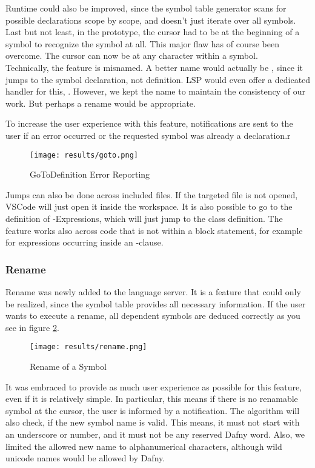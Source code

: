 Runtime could also be improved, since the symbol table generator scans for possible declarations scope by scope, and doesn't just iterate over all symbols.
Last but not least, in the prototype, the cursor had to be at the beginning of a symbol to recognize the symbol at all.
This major flaw has of course been overcome.
The cursor can now be at any character within a symbol.\\

Technically, the feature is misnamed.
A better name would actually be , since it jumps to the symbol declaration, not definition.
LSP would even offer a dedicated handler for this,  \cite{lspspec}.
However, we kept the name to maintain the consistency of our work.
But perhaps a rename would be appropriate.

To increase the user experience with this feature, notifications are sent to the user if an error occurred or the requested symbol was already a declaration.r
\begin{figure}[H]
    \centering
    \texttt{[image: results/goto.png]}
    \caption{GoToDefinition Error Reporting}
    \label{fig:goto}
\end{figure}

Jumps can also be done across included files.
If the targeted file is not opened, VSCode will just open it inside the workspace.
It is also possible to go to the definition of -Expressions, which will just jump to the class definition.
The feature works also across code that is not within a block statement, for example for expressions occurring inside an -clause.

\subsubsection{Rename}
Rename was newly added to the language server.
It is a feature that could only be realized, since the symbol table provides all necessary information.
If the user wants to execute a rename, all dependent symbols are deduced correctly as you see in figure \ref{fig:rename}.

\begin{figure}[H]
    \centering
    \texttt{[image: results/rename.png]}
    \caption{Rename of a Symbol}
    \label{fig:rename}
\end{figure}

It was embraced to provide as much user experience as possible for this feature, even if it is relatively simple.
In particular, this means if there is no renamable symbol at the cursor, the user is informed by a notification.
The algorithm will also check, if the new symbol name is valid.
This means, it must not start with an underscore or number, and it must not be any reserved Dafny word.
Also, we limited the allowed new name to alphanumerical characters, although wild unicode names would be allowed by Dafny.\\

